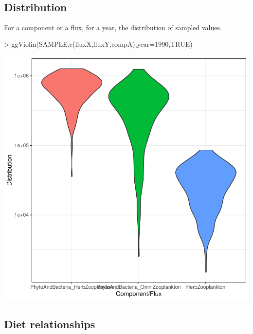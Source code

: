 \documentclass{article}
\begin{document}
\subsection{Distribution}

For a component or a flux, for a year, the distribution of sampled values. 
\begin{Schunk}
\begin{Sinput}
> ggViolin(SAMPLE,c(fluxX,fluxY,compA),year=1990,TRUE)
\end{Sinput}
\end{Schunk}
\includegraphics{barents_SM-018}


\clearpage

\subsection{Diet relationships}
\end{document}

